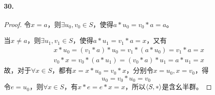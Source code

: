 \documentclass[12pt, a4paper, oneside]{ctexart}
\begin{document}
\paragraph{30.}\begin{proof}
    
    令$x=a$，则$\exists u_0,v_0\in S$，使得$a*u_0=v_0*a=a$。

    当$x\neq a$，则$\exists u_1,v_1\in S$，使得$a*u_1=v_1*a=x$，又有
    \begin{equation*}
        \begin{aligned}
            &x*u_0=(v_1*a)*u_0=v_1*(a*u_0)=v_1*a=x\\
            &v_0*x=v_0*(a*u_1)=(v_0*a)*u_1=a*u_1=x
        \end{aligned}
    \end{equation*}
    故，对于$\forall x\in S$，都有$x=x*u_0=v_0*x$，分别令$x=u_0,x=v_0$，得
    \begin{equation*}
        u_0=v_0*u_0=v_0
    \end{equation*}
    令$e=u_0$，则$\forall x\in S$，有$x*e=e*x=x$，所以$\braket{S,*}$是含幺半群。
\end{proof}
\end{document}
